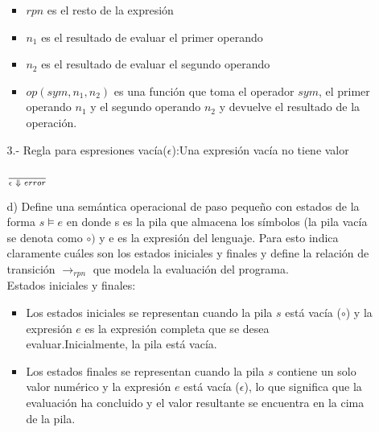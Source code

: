 \documentclass{article}
\begin{document}
\begin{enumerate}
\begin{itemize}
\begin{itemize}
                \item $rpn$ es el resto de la expresión

                \item $n_1$ es el resultado de evaluar el primer operando

                \item $n_2$ es el resultado de evaluar el segundo operando

                \item $op(sym,n_1,n_2)$ es una función que toma el operador $sym$, el primer operando $n_1$ y el segundo operando $n_2$ y devuelve el resultado de la operación.
            \end{itemize}
            
            3.- Regla para espresiones vacía($\epsilon$):Una expresión vacía no tiene valor\\

            \begin{center}
                \Large{$\frac{}{\epsilon\hspace{0.1cm}\Downarrow\hspace{0.1cm}error}$}
            \end{center}
            
            \item[d)] Define una semántica operacional de paso pequeño con estados de la forma $s \models e$ en donde s es la pila que almacena los símbolos (la pila vacía se denota como $\circ)$ y e es la expresión del lenguaje. Para esto indica claramente cuáles son los estados iniciales y finales y define la relación de transición $\rightarrow_{rpn}$ que modela la evaluación del programa.\\

            Estados iniciales y finales:\\

            \begin{itemize}
                \item Los estados iniciales se representan cuando la pila $s$ está vacía ($\circ$) y la expresión $e$ es la expresión completa que se desea evaluar.Inicialmente, la pila está vacía.

                \item Los estados finales se representan cuando la pila $s$ contiene un solo valor numérico y la expresión $e$ está vacía ($\epsilon$), lo que significa que la evaluación ha concluido y el valor resultante se encuentra en la cima de la pila.\\
            \end{itemize}


\end{itemize}
\end{enumerate}
\end{document}
